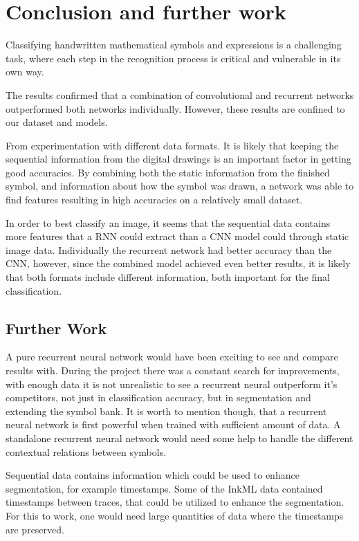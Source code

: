 \chapter{Conclusion and further work}
Classifying handwritten mathematical symbols and expressions is a challenging task, where each step in the recognition process is critical and vulnerable in its own way. 

The results confirmed that a combination of convolutional and recurrent networks outperformed both networks individually. However, these results are confined to our dataset and models.  

From experimentation with different data formats. It is likely that keeping the sequential information from the digital drawings is an important factor in getting good accuracies. By combining both the static information from the finished symbol, and information about how the symbol was drawn, a network was able to find features resulting in high accuracies on a relatively small dataset.

In order to best classify an image, it seems that the sequential data contains more features that a RNN could extract than a CNN model could through static image data. Individually the recurrent network had better accuracy than the CNN, however, since the combined model achieved even better results, it is likely that both formats include different information, both important for the final classification.

\section{Further Work}

A pure recurrent neural network would have been exciting to see and compare results with. During the project there was a constant search for improvements, with enough data it is not unrealistic to see a recurrent neural outperform it's competitors, not just in classification accuracy, but in segmentation and extending the symbol bank. It is worth to mention though, that a recurrent neural network is first powerful when trained with sufficient amount of data. A standalone recurrent neural network would need some help to handle the different contextual relations between symbols.

Sequential data contains information which could be used to enhance segmentation, for example timestamps. Some of the InkML data contained timestamps between traces, that could be utilized to enhance the segmentation. For this to work, one would need large quantities of data where the timestamps are preserved.

